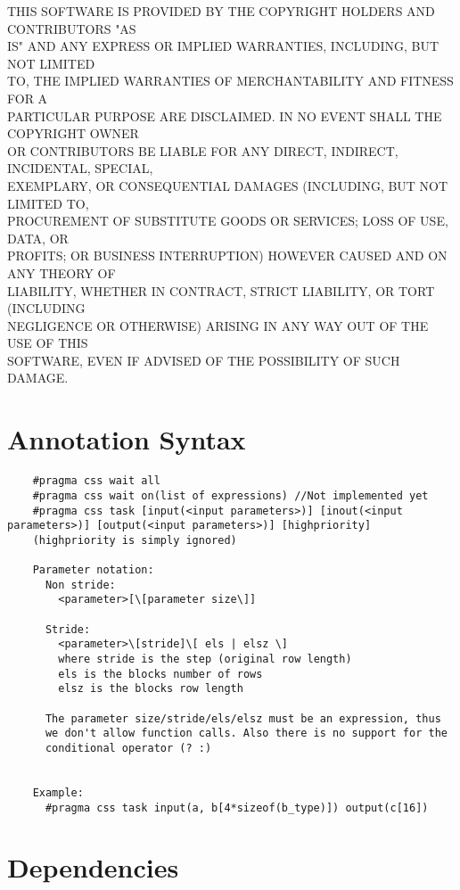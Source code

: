 \documentclass[letterpaper]{article}
\begin{document}
THIS SOFTWARE IS PROVIDED BY THE COPYRIGHT HOLDERS AND CONTRIBUTORS "AS\\
IS" AND ANY EXPRESS OR IMPLIED WARRANTIES, INCLUDING, BUT NOT LIMITED\\
TO, THE IMPLIED WARRANTIES OF MERCHANTABILITY AND FITNESS FOR A\\
PARTICULAR PURPOSE ARE DISCLAIMED. IN NO EVENT SHALL THE COPYRIGHT OWNER\\
OR CONTRIBUTORS BE LIABLE FOR ANY DIRECT, INDIRECT, INCIDENTAL, SPECIAL,\\
EXEMPLARY, OR CONSEQUENTIAL DAMAGES (INCLUDING, BUT NOT LIMITED TO,\\
PROCUREMENT OF SUBSTITUTE GOODS OR SERVICES; LOSS OF USE, DATA, OR\\
PROFITS; OR BUSINESS INTERRUPTION) HOWEVER CAUSED AND ON ANY THEORY OF\\
LIABILITY, WHETHER IN CONTRACT, STRICT LIABILITY, OR TORT (INCLUDING\\
NEGLIGENCE OR OTHERWISE) ARISING IN ANY WAY OUT OF THE USE OF THIS\\
SOFTWARE, EVEN IF ADVISED OF THE POSSIBILITY OF SUCH DAMAGE.\\

\section{Annotation Syntax}

\begin{verbatim}
    #pragma css wait all
    #pragma css wait on(list of expressions) //Not implemented yet
    #pragma css task [input(<input parameters>)] [inout(<input parameters>)] [output(<input parameters>)] [highpriority]
    (highpriority is simply ignored)

    Parameter notation:
      Non stride:
        <parameter>[\[parameter size\]]
      
      Stride:
        <parameter>\[stride]\[ els | elsz \]
        where stride is the step (original row length)
        els is the blocks number of rows
        elsz is the blocks row length

      The parameter size/stride/els/elsz must be an expression, thus
      we don't allow function calls. Also there is no support for the
      conditional operator (? :)
      

    Example:
      #pragma css task input(a, b[4*sizeof(b_type)]) output(c[16])
\end{verbatim}


\section{Dependencies}
\end{document}
